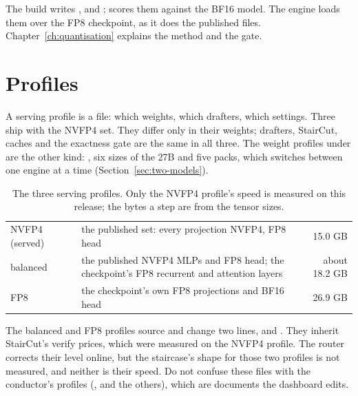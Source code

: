 The build writes ,  and ;  scores them against the BF16 model. The engine loads them over the FP8 checkpoint, as it does the published files. Chapter~\ref{ch:quantisation} explains the method and the gate.

\section{Profiles}

A serving profile is a  file: which weights, which drafters, which settings. Three ship with the NVFP4 set. They differ only in their weights; drafters, StairCut, caches and the exactness gate are the same in all three. The weight profiles under  are the other kind: , six  sizes of the 27B and five  packs, which  switches between one engine at a time (Section~\ref{sec:two-models}).

\begin{table}[htbp]
\centering\small
\caption{The three serving profiles. Only the NVFP4 profile's speed is measured on this release; the bytes a step are \arith{} from the tensor sizes.}\label{tab:profiles-env}
\begin{tabularx}{\linewidth}{@{}L{.17\linewidth}L{.22\linewidth}Yr@{}}
\toprule
{} &  &  &  \\
\midrule
NVFP4 (served) &  & the published set: every projection NVFP4, FP8 head & 15.0 GB \\
balanced &  & the published NVFP4 MLPs and FP8 head; the checkpoint's FP8 recurrent and attention layers & about 18.2 GB \\
FP8 &  & the checkpoint's own FP8 projections and BF16 head & 26.9 GB \\
\bottomrule
\end{tabularx}
\end{table}

The balanced and FP8 profiles source  and change two lines,  and . They inherit StairCut's verify prices, which were measured on the NVFP4 profile. The router corrects their level online, but the staircase's shape for those two profiles is not measured, and neither is their speed. Do not confuse these files with the conductor's profiles (,  and the others), which are documents the dashboard edits.

